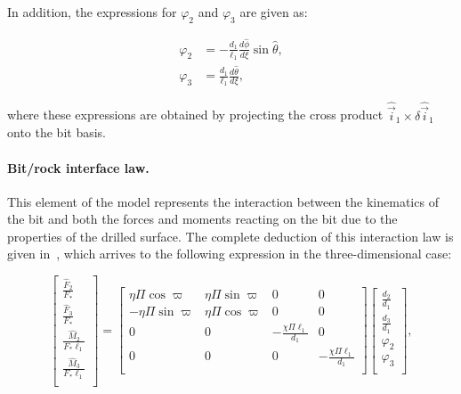 In addition, the expressions for $\varphi_2$ and $\varphi_3$ are given as:

\begin{align}
	{\varphi_2} &= - \frac{d_{1}}{\ell_1} \frac{d\hat\phi}{d\xi}\sin\hat\theta, \nonumber \\
	{\varphi_3} &= \frac{d_{1}}{\ell_1} \frac{d\hat\theta}{d\xi},
	\label{eq:vector_phi}
\end{align}

where these expressions are obtained by projecting the cross product $\hat{\vec{i}}_1 \times \delta \hat{\vec{i}}_1$ onto the bit basis.

\paragraph{Bit/rock interface law.} This element of the model represents the interaction between the kinematics of the bit and both the forces and moments reacting on the bit due to the properties of the drilled surface. The complete deduction of this interaction law is given in~\cite{Perneder2013}, which arrives to the following expression in the three-dimensional case:

\begin{equation}
\begin{bmatrix}
\frac{{{{\hat F}_2}}}{{{F_*}}}    \\
\frac{{{{\hat F}_3}}}{{{F_*}}}       \\
\frac{{{{\hat M}_2}}}{{{F_*}}\ell_1}    \\
\frac{{{{\hat M}_3}}}{{{F_*}}\ell_1}       \\
\end{bmatrix}
=
\begin{bmatrix}
{\eta\Pi}\cos \varpi       & {\eta\Pi}\sin \varpi  & 0 & 0    \\
-{\eta\Pi}\sin \varpi      & {\eta\Pi}\cos \varpi   & 0 & 0     \\
0      & 0  & -\frac{\chi\Pi\ell_1}{d_1} & 0     \\
0      & 0  & 0 & -\frac{\chi\Pi\ell_1}{d_1}     \\
\end{bmatrix}
\begin{bmatrix}
\frac{d_2}{d_1}\\
\frac{d_3}{d_1} \\
\varphi_2 \\
\varphi_3 \\
\end{bmatrix},
\label{eq:bitrockdimensionless}
\end{equation}

